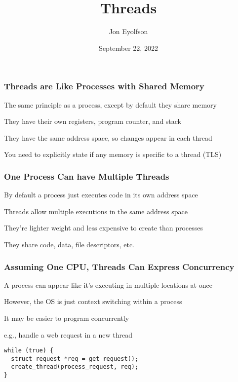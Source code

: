 

\title{Threads}
\author{Jon Eyolfson}
\date{September 22, 2022}


  \begin{frame}
    \titlepage
  \end{frame}

  \begin{frame}
    \frametitle{Threads are Like Processes with Shared Memory}

    The same principle as a process, except by default they share memory

    \hspace{2em} They have their own registers, program counter, and stack

    \vspace{2em}

    They have the same address space, so changes appear in each thread

    \vspace{2em}

    You need to explicitly state if any memory is specific to a thread (TLS)
  \end{frame}

  \begin{frame}
    \frametitle{One Process Can have Multiple Threads}

    By default a process just executes code in its own address space

    \vspace{2em}

    Threads allow multiple executions in the same address space

    \vspace{2em}

    They're lighter weight and less expensive to create than processes

    \hspace{2em} They share code, data, file descriptors, etc.
  \end{frame}

  \begin{frame}[fragile]
    \frametitle{Assuming One CPU, Threads Can Express Concurrency}

    A process can appear like it's executing in multiple locations at once

    \hspace{2em} However, the OS is just context switching within a process

    \vspace{2em}

    It may be easier to program concurrently

    \hspace{2em} e.g., handle a web request in a new thread

    \vspace{2em}

    \begin{lstlisting}
while (true) {
  struct request *req = get_request();
  create_thread(process_request, req);
}
    \end{lstlisting}
  \end{frame}


